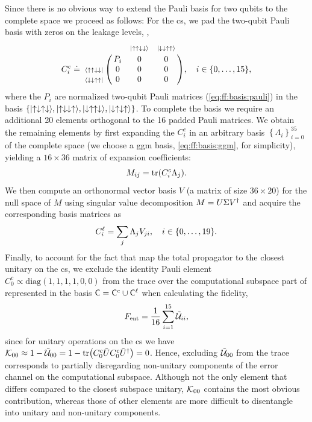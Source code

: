 Since there is no obvious way to extend the Pauli basis for two qubits to the complete space we proceed as follows: For the \gls{cs}, we pad the two-qubit Pauli basis with zeros on the leakage levels, \ie,
\begin{equation}\label{eq:ff:basis:cnot}
    C_i^c\doteq\bordermatrix{~                     &     & \scriptsize{\ketuudd} & \scriptsize{\ketdduu} \cr
                                                   & P_i & 0                     & 0                     \cr
                             \scriptsize{\brauudd} & 0   & 0                     & 0                     \cr
                             \scriptsize{\bradduu} & 0   & 0                     & 0                     \cr}
    \qcomma{i\in\{0,\dotsc,15\}},
\end{equation}
where the $P_i$ are normalized two-qubit Pauli matrices (\cf \cref{eq:ff:basis:pauli}) in the basis $\lbrace\mbox{\ensuremath{\ket{\uparrow\downarrow\uparrow\downarrow}}},\mbox{\ensuremath{\ket{\uparrow\downarrow\downarrow\uparrow}}},\mbox{\ensuremath{\ket{\downarrow\uparrow\uparrow\downarrow}}},\mbox{\ensuremath{\ket{\downarrow\uparrow\downarrow\uparrow}}}\rbrace$.
To complete the basis we require an additional 20 elements orthogonal to the 16 padded Pauli matrices.
We obtain the remaining elements by first expanding the $C_i^c$ in an arbitrary basis $\left\lbrace\Lambda_i\right\rbrace_{i=0}^{35}$ of the complete space (we choose a \gls{ggm} basis, \cref{eq:ff:basis:ggm}, for simplicity), yielding a $16\times 36$ matrix of expansion coefficients:
\begin{equation}
    M_{ij} = \tr(C_i^c\Lambda_j).
\end{equation}
We then compute an orthonormal vector basis $V$ (a matrix of size $36\times 20$) for the null space of $M$ using singular value decomposition $M = U\Sigma V^\dagger$ and acquire the corresponding basis matrices as
\begin{equation}
    C_i^\ell = \sum_j\Lambda_j V_{ji}\qcomma{i\in\lbrace 0,\dotsc,19\rbrace}.
\end{equation}
Finally, to account for the fact that \textcite{Cerfontaine2020} map the total propagator to the closest unitary on the \gls{cs}, we exclude the identity Pauli element $C_0^c\propto\text{diag}(1, 1, 1, 1, 0, 0)$ from the trace over the computational subspace part of \liouvUe represented in the basis $\mathsf{C} = \mathsf{C}^c\cup\mathsf{C}^\ell$ when calculating the fidelity,
\begin{equation}
    F_{\mathrm{ent}} = \frac{1}{16}\sum_{i=1}^{15}\mathcal{\tilde{U}}_{ii},
\end{equation}
since for unitary operations on the \gls{cs} we have $\mathcal{K}_{00} \approx 1 - \mathcal{\tilde{U}}_{00} = 1 - \mathrm{tr}\bigl(C_0^c\tilde{U} C_0^c\tilde{U}^\dagger\bigr) = 0$.
Hence, excluding $\mathcal{\tilde{U}}_{00}$ from the trace corresponds to partially disregarding non-unitary components of the error channel on the computational subspace.
Although not the only element that differs compared to the closest subspace unitary, $\mathcal{K}_{00}$ contains the most obvious contribution, whereas those of other elements are more difficult to disentangle into unitary and non-unitary components.

